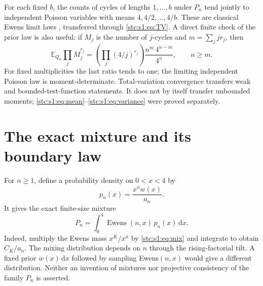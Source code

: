 \documentclass[11pt,letterpaper]{article}
\numberwithin{equation}{section}
\theoremstyle{remark}\newtheorem{remark}[theorem]{Remark}
\newcommand{\E}{\mathbb E}
\newcommand{\dd}{\,\mathrm d}
\newcommand{\rf}[2]{#1^{\overline{#2}}}
\newcommand{\ff}[2]{#1^{\underline{#2}}}
\begin{document}
For each fixed $b$, the counts of cycles of lengths $1,\ldots,b$ under $P_n$ tend jointly to independent Poisson variables with means $4,4/2,\ldots,4/b$. These are classical Ewens limit laws \cite{nz}, transferred through \eqref{stc:s1:eq:TV}. A direct finite check of the prior law is also useful: if $M_j$ is the number of $j$-cycles and $m=\sum_jjr_j$, then
\begin{equation}\label{stc:s1:eq:factorialmoments}
 \E_{Q_n}\prod_j\ff{M_j}{r_j}
 =\left(\prod_j(4/j)^{r_j}\right)
   \frac{\ff{n}{m}\,\rf{4}{n-m}}{\rf4n},\qquad n\geq m.
\end{equation}
For fixed multiplicities the last ratio tends to one; the limiting independent Poisson law is moment-determinate. Total-variation convergence transfers weak and bounded-test-function statements. It does not by itself transfer unbounded moments; \eqref{stc:s1:eq:mean}--\eqref{stc:s1:eq:variance} were proved separately.

\section{The exact mixture and its boundary law}\label{stc:s1:sec:mixture}
For $n\geq1$, define a probability density on $0<x<4$ by
\begin{equation}\label{stc:s1:eq:mix}
 p_n(x)=\frac{\rf{x}{n}w(x)}{a_n}.
\end{equation}
It gives the exact finite-size mixture
\begin{equation}\label{stc:s1:eq:mixture}
 P_n=\int_0^4\operatorname{Ewens}(n,x)\,p_n(x)\dd x.
\end{equation}
Indeed, multiply the Ewens mass $x^K/\rf{x}{n}$ by \eqref{stc:s1:eq:mix} and integrate to obtain $C_K/a_n$. The mixing distribution depends on $n$ through the rising-factorial tilt. A fixed prior $w(x)\dd x$ followed by sampling Ewens$(n,x)$ would give a different distribution. Neither an invention of mixtures nor projective consistency of the family $P_n$ is asserted.
\end{document}
